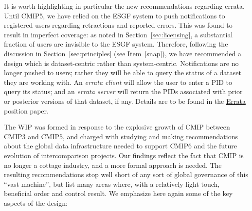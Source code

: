 \documentclass[gmd,manuscript]{copernicus}
\newcommand{\secref}[1] {\mbox{Section  \ref{sec:#1}}}
\begin{document}
It is worth highlighting in particular the new recommendations
regarding errata. Until CMIP5, we have relied on the ESGF system to
push notifications to registered users regarding retractions and
reported errors. This was found to result in imperfect coverage: as
noted in \secref{licensing}, a substantial fraction of users are
invisible to the ESGF system. Therefore, following the discussion in
\secref{principles} (see Item~\ref{snap}), we have recommended a
design which is dataset-centric rather than system-centric.
Notifications are no longer pushed to users; rather they will be able
to query the status of a dataset they are working with. An
\emph{errata client} will allow the user to enter a PID to query its
status; and an \emph{errata server} will return the PIDs associated
with prior or posterior versions of that dataset, if any. Details are
to be found in the \href{https://goo.gl/fvVTVo}{Errata} position
paper.

\label{sec:summary}

The WIP was formed in response to the explosive growth of CMIP between
CMIP3 and CMIP5, and charged with studying and making recommendations
about the global data infrastructure needed to support CMIP6 and the
future evolution of intercomparison projects. Our findings reflect 
the fact that CMIP is no longer a cottage industry, and a more formal 
approach is needed. The resulting recommendations stop well short of 
any sort of global governance of this ``vast machine'', but list many 
areas where, with a relatively light touch, beneficial order and 
control result. We emphasize here again some of the key aspects of 
the design:
\end{document}
